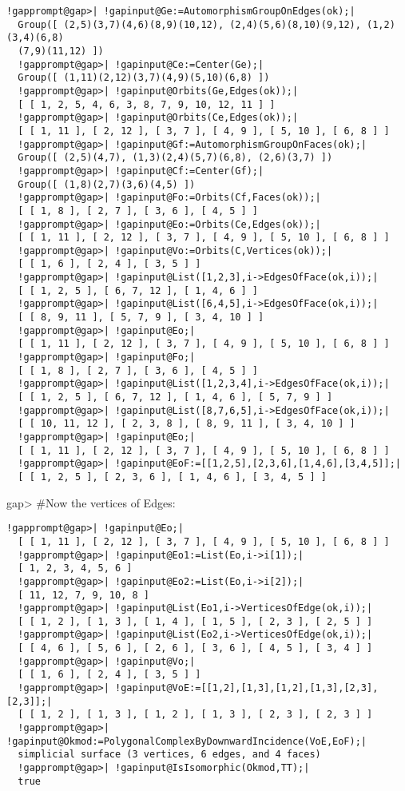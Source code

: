 \documentclass[a4paper,11pt]{report}
\begin{document}
{{{ 
\begin{Verbatim}[commandchars=!@|,fontsize=\small,frame=single,label=Example]
  !gapprompt@gap>| !gapinput@Ge:=AutomorphismGroupOnEdges(ok);|
  Group([ (2,5)(3,7)(4,6)(8,9)(10,12), (2,4)(5,6)(8,10)(9,12), (1,2)(3,4)(6,8)
  (7,9)(11,12) ])
  !gapprompt@gap>| !gapinput@Ce:=Center(Ge);|
  Group([ (1,11)(2,12)(3,7)(4,9)(5,10)(6,8) ])
  !gapprompt@gap>| !gapinput@Orbits(Ge,Edges(ok));|
  [ [ 1, 2, 5, 4, 6, 3, 8, 7, 9, 10, 12, 11 ] ]
  !gapprompt@gap>| !gapinput@Orbits(Ce,Edges(ok));|
  [ [ 1, 11 ], [ 2, 12 ], [ 3, 7 ], [ 4, 9 ], [ 5, 10 ], [ 6, 8 ] ]
  !gapprompt@gap>| !gapinput@Gf:=AutomorphismGroupOnFaces(ok);|
  Group([ (2,5)(4,7), (1,3)(2,4)(5,7)(6,8), (2,6)(3,7) ])
  !gapprompt@gap>| !gapinput@Cf:=Center(Gf);|
  Group([ (1,8)(2,7)(3,6)(4,5) ])
  !gapprompt@gap>| !gapinput@Fo:=Orbits(Cf,Faces(ok));|
  [ [ 1, 8 ], [ 2, 7 ], [ 3, 6 ], [ 4, 5 ] ]
  !gapprompt@gap>| !gapinput@Eo:=Orbits(Ce,Edges(ok));|
  [ [ 1, 11 ], [ 2, 12 ], [ 3, 7 ], [ 4, 9 ], [ 5, 10 ], [ 6, 8 ] ]
  !gapprompt@gap>| !gapinput@Vo:=Orbits(C,Vertices(ok));|
  [ [ 1, 6 ], [ 2, 4 ], [ 3, 5 ] ]
  !gapprompt@gap>| !gapinput@List([1,2,3],i->EdgesOfFace(ok,i));|
  [ [ 1, 2, 5 ], [ 6, 7, 12 ], [ 1, 4, 6 ] ]
  !gapprompt@gap>| !gapinput@List([6,4,5],i->EdgesOfFace(ok,i));|
  [ [ 8, 9, 11 ], [ 5, 7, 9 ], [ 3, 4, 10 ] ]
  !gapprompt@gap>| !gapinput@Eo;|
  [ [ 1, 11 ], [ 2, 12 ], [ 3, 7 ], [ 4, 9 ], [ 5, 10 ], [ 6, 8 ] ]
  !gapprompt@gap>| !gapinput@Fo;|
  [ [ 1, 8 ], [ 2, 7 ], [ 3, 6 ], [ 4, 5 ] ]
  !gapprompt@gap>| !gapinput@List([1,2,3,4],i->EdgesOfFace(ok,i));|
  [ [ 1, 2, 5 ], [ 6, 7, 12 ], [ 1, 4, 6 ], [ 5, 7, 9 ] ]
  !gapprompt@gap>| !gapinput@List([8,7,6,5],i->EdgesOfFace(ok,i));|
  [ [ 10, 11, 12 ], [ 2, 3, 8 ], [ 8, 9, 11 ], [ 3, 4, 10 ] ]
  !gapprompt@gap>| !gapinput@Eo;|
  [ [ 1, 11 ], [ 2, 12 ], [ 3, 7 ], [ 4, 9 ], [ 5, 10 ], [ 6, 8 ] ]
  !gapprompt@gap>| !gapinput@EoF:=[[1,2,5],[2,3,6],[1,4,6],[3,4,5]];|
  [ [ 1, 2, 5 ], [ 2, 3, 6 ], [ 1, 4, 6 ], [ 3, 4, 5 ] ]
\end{Verbatim}
 

 gap{\textgreater} \#Now the vertices of Edges: 

 
\begin{Verbatim}[commandchars=!@|,fontsize=\small,frame=single,label=Example]
  !gapprompt@gap>| !gapinput@Eo;|
  [ [ 1, 11 ], [ 2, 12 ], [ 3, 7 ], [ 4, 9 ], [ 5, 10 ], [ 6, 8 ] ]
  !gapprompt@gap>| !gapinput@Eo1:=List(Eo,i->i[1]);|
  [ 1, 2, 3, 4, 5, 6 ]
  !gapprompt@gap>| !gapinput@Eo2:=List(Eo,i->i[2]);|
  [ 11, 12, 7, 9, 10, 8 ]
  !gapprompt@gap>| !gapinput@List(Eo1,i->VerticesOfEdge(ok,i));|
  [ [ 1, 2 ], [ 1, 3 ], [ 1, 4 ], [ 1, 5 ], [ 2, 3 ], [ 2, 5 ] ]
  !gapprompt@gap>| !gapinput@List(Eo2,i->VerticesOfEdge(ok,i));|
  [ [ 4, 6 ], [ 5, 6 ], [ 2, 6 ], [ 3, 6 ], [ 4, 5 ], [ 3, 4 ] ]
  !gapprompt@gap>| !gapinput@Vo;|
  [ [ 1, 6 ], [ 2, 4 ], [ 3, 5 ] ]
  !gapprompt@gap>| !gapinput@VoE:=[[1,2],[1,3],[1,2],[1,3],[2,3],[2,3]];|
  [ [ 1, 2 ], [ 1, 3 ], [ 1, 2 ], [ 1, 3 ], [ 2, 3 ], [ 2, 3 ] ]
  !gapprompt@gap>| !gapinput@Okmod:=PolygonalComplexByDownwardIncidence(VoE,EoF);|
  simplicial surface (3 vertices, 6 edges, and 4 faces)
  !gapprompt@gap>| !gapinput@IsIsomorphic(Okmod,TT);|
  true
\end{Verbatim}
 }

}}
\end{document}
